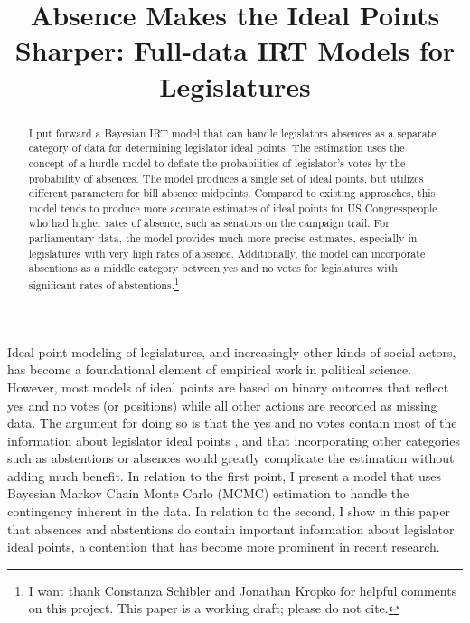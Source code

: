 %

\title{Absence Makes the Ideal Points Sharper: Full-data IRT Models for Legislatures}
\usepackage{amsmath,amsthm, amssymb, latexsym}
\linespread{1.5}

	
	\maketitle
	
	\begin{abstract}
		I put forward a Bayesian IRT model that can handle legislators absences as a separate category of data for determining legislator ideal points. The estimation uses the concept of a hurdle model to deflate the probabilities of legislator’s votes by the probability of absences. The model produces a single set of ideal points, but utilizes different parameters for bill absence midpoints. Compared to existing approaches, this model tends to produce more accurate estimates of ideal points for US Congresspeople who had higher rates of absence, such as senators on the campaign trail. For parliamentary data, the model provides much more precise estimates, especially in legislatures with very high rates of absence. Additionally, the model can incorporate absentions as a middle category between yes and no votes for legislatures with significant rates of abstentions.\footnote{I want thank Constanza Schibler and Jonathan Kropko for helpful comments on this project. This paper is a working draft; please do not cite.}
	\end{abstract}
	
	Ideal point modeling of legislatures, and increasingly other kinds of social actors, has become a foundational element of empirical work in political science. However, most models of ideal points are based on binary outcomes that reflect yes and no votes (or positions) while all other actions are recorded as missing data. The argument for doing so is that the yes and no votes contain most of the information about legislator ideal points \parencite[4]{poole2008}, and that incorporating other categories such as abstentions or absences would greatly complicate the estimation without adding much benefit. In relation to the first point, I present a model that uses Bayesian Markov Chain Monte Carlo (MCMC) estimation to handle the contingency inherent in the data. In relation to the second, I show in this paper that absences and abstentions do contain important information about legislator ideal points, a contention that has become more prominent in recent research.
	
